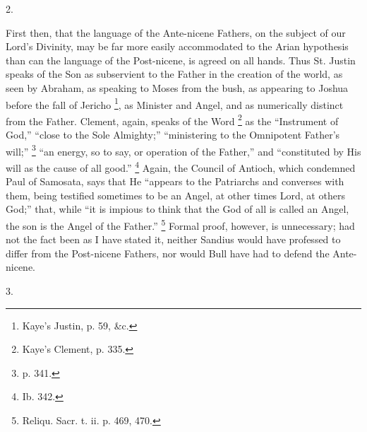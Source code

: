 2.

First then, that the language of the Ante-nicene
Fathers, on the subject of our Lord's Divinity, may be
far more easily accommodated to the Arian hypothesis than
can the language of the Post-nicene, is agreed on all
hands. Thus St. Justin speaks of the Son as subservient
to the Father in the creation of the world, as seen by
Abraham, as speaking to Moses from the bush, as appearing
to Joshua before the fall of Jericho \footnote{Kaye's Justin, p. 59, \&c.}, as Minister and Angel, and
as numerically distinct from the Father. Clement, again,
speaks of the Word \footnote{Kaye's Clement, p. 335.} as the ``Instrument of
God,'' ``close to the Sole Almighty;''
``ministering to the Omnipotent Father's will;''
\footnote{p. 341.}
``an energy, so to say, or operation of the
Father,'' and ``constituted by His will as the
cause of all good.'' \footnote{Ib. 342.} Again, the Council of
Antioch, which condemned Paul of Samosata, says that He
``appears to the Patriarchs and converses with them,
being testified sometimes to be an Angel, at other times
Lord, at others God;'' that, while ``it is
impious to think that the God of all is called an Angel, the son is the Angel of the Father.'' \footnote{Reliqu. Sacr. t. ii. p. 469,
470.}
Formal proof, however, is unnecessary; had not the fact
been as I have stated it, neither Sandius would have
professed to differ from the Post-nicene Fathers, nor
would Bull have had to defend the Ante-nicene.

3.

